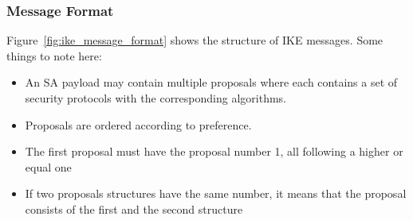 \subsubsection{Message Format}
Figure~\ref{fig:ike_message_format} shows the structure of IKE messages.
Some things to note here:
\begin{itemize}
  \item An SA payload may contain multiple proposals where each contains a set of security protocols with the corresponding algorithms.
  \item Proposals are ordered according to preference.
  \item The first proposal must have the proposal number 1, all following a higher or equal one
  \item If two proposals structures have the same number, it means that the proposal consists of the first and the second structure
\end{itemize}
